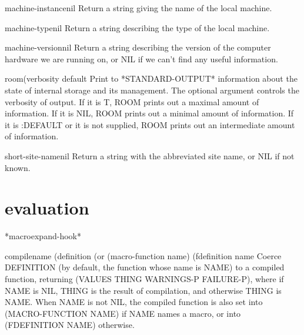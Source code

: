 \begin{function}{machine-instance}{nil}{}
  Return a string giving the name of the local machine.
\end{function}

\begin{function}{machine-type}{nil}{}
  Return a string describing the type of the local machine.
\end{function}

\begin{function}{machine-version}{nil}{}
  Return a string describing the version of the computer hardware we
are running on, or NIL if we can't find any useful information.
\end{function}

\begin{function}{room}{\op (verbosity default}{}
  Print to *STANDARD-OUTPUT* information about the state of internal
  storage and its management. The optional argument controls the
  verbosity of output. If it is T, ROOM prints out a maximal amount of
  information. If it is NIL, ROOM prints out a minimal amount of
  information. If it is :DEFAULT or it is not supplied, ROOM prints out
  an intermediate amount of information.
\end{function}

\begin{function}{short-site-name}{nil}{}
  Return a string with the abbreviated site name, or NIL if not known.
\end{function}

\section{evaluation}

\begin{variable}{*macroexpand-hook*}{}{}
  
\end{variable}

\begin{function}{compile}{name \op (definition (or (macro-function name) (fdefinition name}{}
  Coerce DEFINITION (by default, the function whose name is NAME)
  to a compiled function, returning (VALUES THING WARNINGS-P FAILURE-P),
  where if NAME is NIL, THING is the result of compilation, and
  otherwise THING is NAME. When NAME is not NIL, the compiled function
  is also set into (MACRO-FUNCTION NAME) if NAME names a macro, or into
  (FDEFINITION NAME) otherwise.
\end{function}

